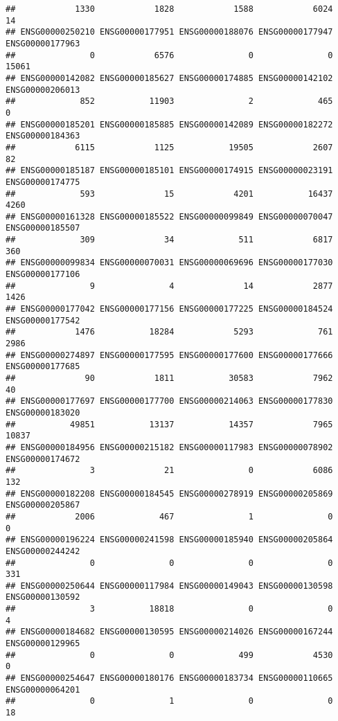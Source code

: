 \documentclass[
]{article}
\begin{document}
\begin{verbatim}
##            1330            1828            1588            6024              14 
## ENSG00000250210 ENSG00000177951 ENSG00000188076 ENSG00000177947 ENSG00000177963 
##               0            6576               0               0           15061 
## ENSG00000142082 ENSG00000185627 ENSG00000174885 ENSG00000142102 ENSG00000206013 
##             852           11903               2             465               0 
## ENSG00000185201 ENSG00000185885 ENSG00000142089 ENSG00000182272 ENSG00000184363 
##            6115            1125           19505            2607              82 
## ENSG00000185187 ENSG00000185101 ENSG00000174915 ENSG00000023191 ENSG00000174775 
##             593              15            4201           16437            4260 
## ENSG00000161328 ENSG00000185522 ENSG00000099849 ENSG00000070047 ENSG00000185507 
##             309              34             511            6817             360 
## ENSG00000099834 ENSG00000070031 ENSG00000069696 ENSG00000177030 ENSG00000177106 
##               9               4              14            2877            1426 
## ENSG00000177042 ENSG00000177156 ENSG00000177225 ENSG00000184524 ENSG00000177542 
##            1476           18284            5293             761            2986 
## ENSG00000274897 ENSG00000177595 ENSG00000177600 ENSG00000177666 ENSG00000177685 
##              90            1811           30583            7962              40 
## ENSG00000177697 ENSG00000177700 ENSG00000214063 ENSG00000177830 ENSG00000183020 
##           49851           13137           14357            7965           10837 
## ENSG00000184956 ENSG00000215182 ENSG00000117983 ENSG00000078902 ENSG00000174672 
##               3              21               0            6086             132 
## ENSG00000182208 ENSG00000184545 ENSG00000278919 ENSG00000205869 ENSG00000205867 
##            2006             467               1               0               0 
## ENSG00000196224 ENSG00000241598 ENSG00000185940 ENSG00000205864 ENSG00000244242 
##               0               0               0               0             331 
## ENSG00000250644 ENSG00000117984 ENSG00000149043 ENSG00000130598 ENSG00000130592 
##               3           18818               0               0               4 
## ENSG00000184682 ENSG00000130595 ENSG00000214026 ENSG00000167244 ENSG00000129965 
##               0               0             499            4530               0 
## ENSG00000254647 ENSG00000180176 ENSG00000183734 ENSG00000110665 ENSG00000064201 
##               0               1               0               0              18 

\end{verbatim}
\end{document}
